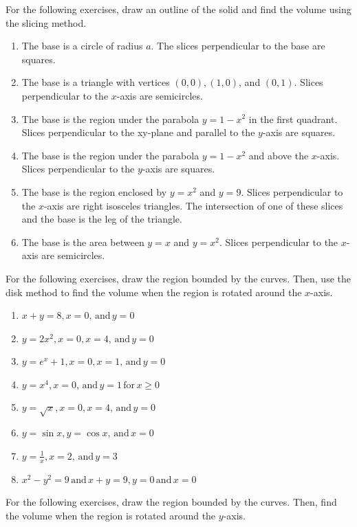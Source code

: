 \documentclass{exercises}
\begin{document}
For the following exercises, draw an outline of the solid and find the volume using the slicing method.

\begin{enumerate}[resume]
\item The base is a circle of radius $a$. The slices perpendicular to the base are squares.
\item The base is a triangle with vertices $(0,0),(1,0)$, and $(0,1)$. Slices perpendicular to the $x$-axis are semicircles.
\item The base is the region under the parabola $y=1-x^{2}$ in the first quadrant. Slices perpendicular to the xy-plane and parallel to the $y$-axis are squares.
\item The base is the region under the parabola $y=1-x^{2}$ and above the $x$-axis. Slices perpendicular to the $y$-axis are squares.
\item The base is the region enclosed by $y=x^{2}$ and $y=9$. Slices perpendicular to the $x$-axis are right isosceles triangles. The intersection of one of these slices and the base is the leg of the triangle.
\item The base is the area between $y=x$ and $y=x^{2}$. Slices perpendicular to the $x$-axis are semicircles.
\end{enumerate}

For the following exercises, draw the region bounded by the curves. Then, use the disk method to find the volume when the region is rotated around the $x$-axis.

\begin{enumerate}[resume]
\item $x+y=8,x=0,\,\text{and}\,y=0$
\item $y=2x^{2},x=0,x=4,\,\text{and}\,y=0$
\item $y=e^{x}+1,x=0,x=1,\,\text{and}\,y=0$
\item $y=x^{4},x=0,\,\text{and}\,y=1\,\text{for}\,x\ge0$
\item $y=\sqrt{x},x=0,x=4,\,\text{and}\,y=0$
\item $y=\sin x,y=\cos x,\,\text{and}\,x=0$
\item $y=\frac{1}{x},x=2,\,\text{and}\,y=3$
\item $x^{2}-y^{2}=9\,\text{and}\,x+y=9,y=0\,\text{and}\,x=0$
\end{enumerate}

For the following exercises, draw the region bounded by the curves. Then, find the volume when the region is rotated around the $y$-axis.
\end{document}
